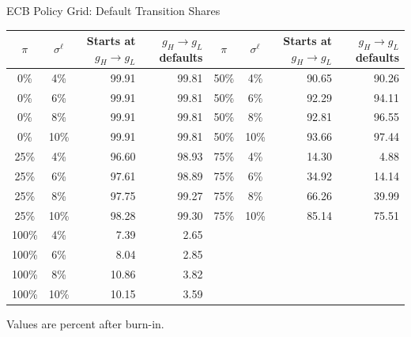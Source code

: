 \begin{frame}[shrink=6]{ECB Policy Grid: Default Transition Shares}
\hypertarget{policy-transition}{}
\scriptsize
\centering
\begin{tabular}{ccrr@{\qquad}ccrr}
\toprule
$\pi$ & $\sigma^\ell$ & Starts at $g_H\!\to g_L$ & $g_H\!\to g_L$ defaults
& $\pi$ & $\sigma^\ell$ & Starts at $g_H\!\to g_L$ & $g_H\!\to g_L$ defaults \\
\midrule
0\%  & 4\%  & 99.91 & 99.81 & 50\%  & 4\%  & 90.65 & 90.26 \\
0\%  & 6\%  & 99.91 & 99.81 & 50\%  & 6\%  & 92.29 & 94.11 \\
0\%  & 8\%  & 99.91 & 99.81 & 50\%  & 8\%  & 92.81 & 96.55 \\
0\%  & 10\% & 99.91 & 99.81 & 50\%  & 10\% & 93.66 & 97.44 \\
\midrule
25\% & 4\%  & 96.60 & 98.93 & 75\%  & 4\%  & 14.30 & 4.88 \\
25\% & 6\%  & 97.61 & 98.89 & 75\%  & 6\%  & 34.92 & 14.14 \\
25\% & 8\%  & 97.75 & 99.27 & 75\%  & 8\%  & 66.26 & 39.99 \\
25\% & 10\% & 98.28 & 99.30 & 75\%  & 10\% & 85.14 & 75.51 \\
\midrule
100\% & 4\%  & 7.39 & 2.65 &  &  &  &  \\
100\% & 6\%  & 8.04 & 2.85 &  &  &  &  \\
100\% & 8\%  & 10.86 & 3.82 &  &  &  &  \\
100\% & 10\% & 10.15 & 3.59 &  &  &  &  \\
\bottomrule
\end{tabular}

\medskip
{\scriptsize Values are percent after burn-in.}

\medskip
\hyperlink{policy-first}{}
\hspace{0.6em}
\hyperlink{baseline-transition}{}
\end{frame}
